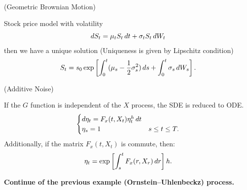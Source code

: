 \begin{example}{(Geometric Brownian Motion)}\label{Ex: GBM}

Stock price model with volatility
\begin{equation*}
    \mathop{}\!d S_t = \mu_t S_t \mathop{}\!d t + \sigma_t S_t \mathop{}\!d W_t
\end{equation*}
then we have a unique solution (Uniqueness is given by Lipschitz condition) 
\begin{equation*}
    S_t = s_0 \exp\left[\int_0^t (\mu_s - \frac{1}{2}\sigma_s^2) \mathop{}\!d s + \int_0^t \sigma_s \mathop{}\!d W_s \right].
\end{equation*}
\end{example}

\begin{example}{(Additive Noise)}

If the $G$ function is independent of the $X$ process, the SDE is reduced to ODE.
\begin{equation*}
    \begin{cases}
    \mathop{}\!d \eta_t = F_x(t,X_t)\eta_t^h \mathop{}\!d t \\
    \eta_s = 1 &s\leq t\leq T.
    \end{cases}
\end{equation*}
Additionally, if the matrix $F_x(t,X_t)$ is commute, then:
\begin{equation*}
    \eta_t = \exp \left[\int_s^t F_x(r,X_r) \mathop{}\!d r\right] h.
\end{equation*}
\end{example}
\textbf{Continue of the previous example (Ornstein–Uhlenbeckz) process.}

